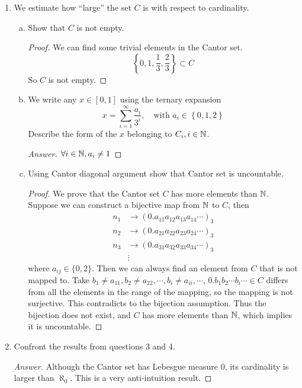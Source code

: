 \begin{enumerate}
\begin{enumerate}[(a)]
\begin{proof}
        By $\sigma$-additivity and Fubini's theorem, we can also interchange the order of limit and summation,
        \[ \lambda(C)=\lambda\left(\lim_{n\to\infty}C_n \right)=\lim_{n\to\infty}\lambda(C_n)=\lim_{n\to\infty}\left(\frac{2}{3}\right)^n=0  \]
        \end{proof}
    \end{enumerate}
    \item We estimate how ``large'' the set $C$ is with respect to cardinality.
    \begin{enumerate}[(a)]
    	\item Show that $C$ is not empty.
        \begin{proof}
        We can find some trivial elements in the Cantor set.
        \[ \left\{0,1,\frac{1}{3},\frac{2}{3} \right\}\subset C \]
        So $C$ is not empty.
        \end{proof}
        \item We write any \(x\in[0,1]\) using the ternary expansion
        \[ x=\sum_{i=1}^\infty \frac{a_i}{3^i}, \quad \textrm{with }a_i\in\left\{0,1,2\right\} \]
        Describe the form of the $x$ belonging to \(C_i, i\in\mathbb{N}\).
        \begin{proof}[Answer]
        \( \forall i\in\mathbb{N}, a_i\neq 1 \)
        \end{proof}
        \item Using Cantor diagonal argument show that Cantor set is uncountable.
        \begin{proof}
		We prove that the Cantor set $C$ has more elements than $\mathbb{N}$.
		Suppose we can construct a bijective map from $\mathbb{N}$ to $C$, then
		\begin{align*}
		n_1 &\to (0.a_{11}a_{12}a_{13}a_{14}\cdots)_3\\
		n_2 &\to (0.a_{21}a_{22}a_{23}a_{24}\cdots)_3\\
		n_3 &\to (0.a_{31}a_{32}a_{33}a_{34}\cdots)_3\\
		&\vdots
		\end{align*}
		where \(a_{ij}\in\{0,2\}\).
		Then we can always find an element from $C$ that is not mapped to.
		Take \(b_1\neq a_{11},b_2\neq a_{22},\cdots,b_i\neq a_{ii},\cdots\), \(0.b_1 b_2 \cdots b_i\cdots\in C\) differs from all the elements in the range of the mapping, so the mapping is not surjective.
		This contradicts to the bijection assumption.
		Thus the bijection does not exist, and $C$ has more elements than $\mathbb{N}$, which implies it is uncountable.
	\end{proof}
    \end{enumerate}
    \item Confront the results from questions 3 and 4.
    \begin{proof}[Answer]
    Although the Cantor set has Lebesgue measure 0, its cardinality is larger than $\aleph_0$.
    This is a very anti-intuition result.
    \end{proof}
\end{enumerate}
